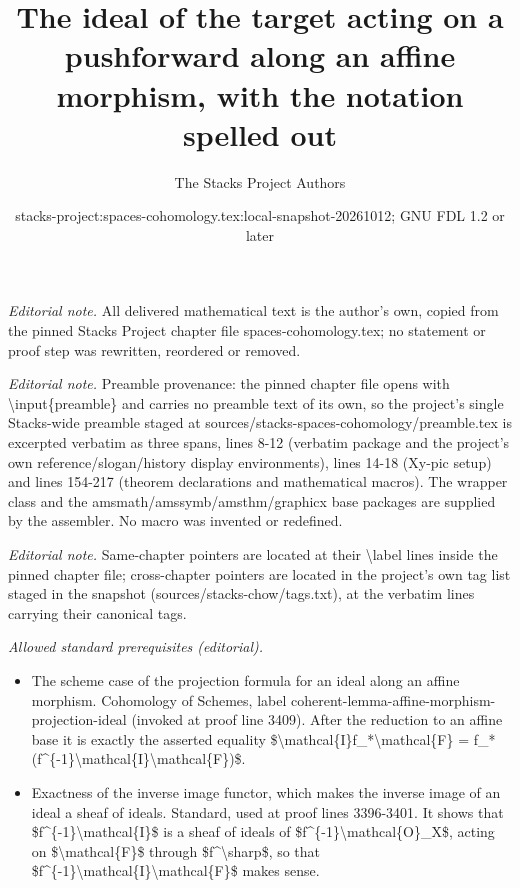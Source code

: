 \documentclass[10pt,a4paper]{amsart}
\title{The ideal of the target acting on a pushforward along an affine morphism, with the notation spelled out}
\author{The Stacks Project Authors}
\date{stacks-project:spaces-cohomology.tex:local-snapshot-20261012; GNU FDL 1.2 or later}
\theoremstyle{plain}
\theoremstyle{definition}
\theoremstyle{remark}
\numberwithin{equation}{subsection}
\begin{document}
\maketitle
\noindent\textit{Editorial note.} All delivered mathematical text is the author's own, copied from the pinned Stacks Project chapter file spaces-cohomology.tex; no statement or proof step was rewritten, reordered or removed.\par\medskip
\noindent\textit{Editorial note.} Preamble provenance: the pinned chapter file opens with \textbackslash{}input\{preamble\} and carries no preamble text of its own, so the project's single Stacks-wide preamble staged at sources/stacks-spaces-cohomology/preamble.tex is excerpted verbatim as three spans, lines 8-12 (verbatim package and the project's own reference/slogan/history display environments), lines 14-18 (Xy-pic setup) and lines 154-217 (theorem declarations and mathematical macros). The wrapper class and the amsmath/amssymb/amsthm/graphicx base packages are supplied by the assembler. No macro was invented or redefined.\par\medskip
\noindent\textit{Editorial note.} Same-chapter pointers are located at their \textbackslash{}label lines inside the pinned chapter file; cross-chapter pointers are located in the project's own tag list staged in the snapshot (sources/stacks-chow/tags.txt), at the verbatim lines carrying their canonical tags.\par\medskip
\noindent\textit{Allowed standard prerequisites (editorial).}\begin{itemize}
\item The scheme case of the projection formula for an ideal along an affine morphism. Cohomology of Schemes, label coherent-lemma-affine-morphism-projection-ideal (invoked at proof line 3409). After the reduction to an affine base it is exactly the asserted equality \$\textbackslash{}mathcal\{I\}f\_*\textbackslash{}mathcal\{F\} = f\_*(f\textasciicircum{}\{-1\}\textbackslash{}mathcal\{I\}\textbackslash{}mathcal\{F\})\$.
\item Exactness of the inverse image functor, which makes the inverse image of an ideal a sheaf of ideals. Standard, used at proof lines 3396-3401. It shows that \$f\textasciicircum{}\{-1\}\textbackslash{}mathcal\{I\}\$ is a sheaf of ideals of \$f\textasciicircum{}\{-1\}\textbackslash{}mathcal\{O\}\_X\$, acting on \$\textbackslash{}mathcal\{F\}\$ through \$f\textasciicircum{}\textbackslash{}sharp\$, so that \$f\textasciicircum{}\{-1\}\textbackslash{}mathcal\{I\}\textbackslash{}mathcal\{F\}\$ makes sense.
\end{itemize}\medskip
\end{document}
